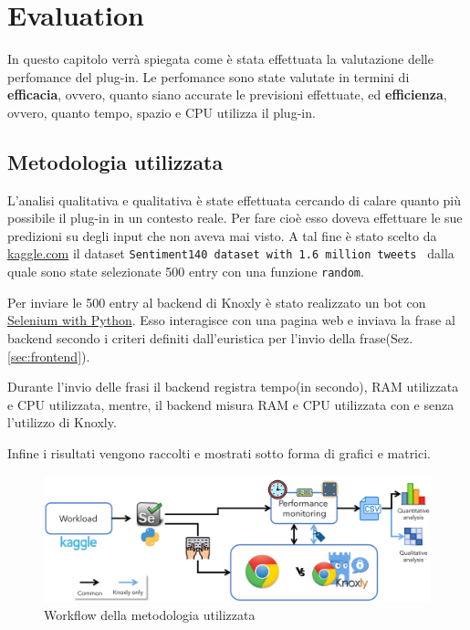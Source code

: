 \chapter{Evaluation}
In questo capitolo verrà spiegata come è stata effettuata la valutazione delle perfomance del plug-in. Le perfomance sono state valutate in termini di \textbf{efficacia}, ovvero, quanto siano accurate le previsioni effettuate, ed \textbf{efficienza}, ovvero, quanto tempo, spazio e CPU utilizza il plug-in.   

\section{Metodologia utilizzata}
\label{sec:metodologiaevaluation}
L'analisi qualitativa e qualitativa è state effettuata cercando di calare quanto più possibile il plug-in in un contesto reale. Per fare cioè esso doveva effettuare le sue predizioni su degli input che non aveva mai visto. A tal fine è stato scelto da \href{https://www.kaggle.com/}{kaggle.com} il dataset {\tt Sentiment140 dataset with 1.6 million tweets }\cite{sentiment140} dalla quale sono state selezionate 500 entry con una funzione {\tt random}.

Per inviare le 500 entry al backend di Knoxly è stato realizzato un bot con \href{https://selenium-python.readthedocs.io/}{Selenium with Python}. Esso interagisce con una pagina web e inviava la frase al backend secondo i criteri definiti  dall'euristica per l'invio della frase(Sez. \ref{sec:frontend}).

Durante l'invio delle frasi il backend registra tempo(in secondo), RAM utilizzata e CPU utilizzata, mentre, il backend misura RAM e CPU utilizzata con e senza l'utilizzo di Knoxly.

Infine i risultati vengono raccolti e mostrati sotto forma di grafici e matrici.

\begin{figure}[h!t]
    \centering
    \includegraphics[width=15cm]{Figure/grafici/evaluation_cropped.pdf}
    \caption{Workflow della metodologia utilizzata}
    \label{fig:methodeval}
\end{figure}
\FloatBarrier

